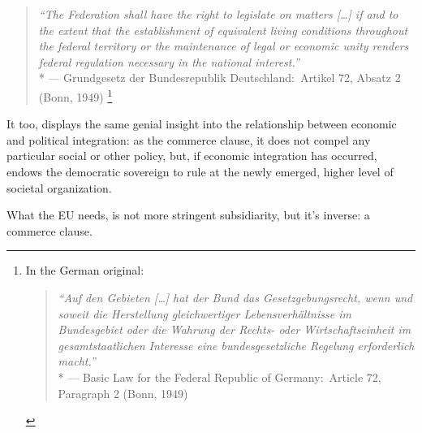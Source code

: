 \begin{quote}
	\emph{``The Federation shall have the right to legislate on matters [\ldots] if and to the extent that the establishment of equivalent living conditions throughout the federal territory or the maintenance of legal or economic unity renders federal regulation necessary in the national interest.''}\\*
	--- Grundgesetz der Bundesrepublik Deutschland:\ Artikel 72, Absatz 2 (Bonn, 1949)
	\footnote{
		In the German original:
		\begin{quote}
			\emph{``Auf den Gebieten [\ldots] hat der Bund das Gesetzgebungsrecht, wenn und soweit die Herstellung gleichwertiger Lebensverhältnisse im Bundesgebiet oder die Wahrung der Rechts- oder Wirtschaftseinheit im gesamtstaatlichen Interesse eine bundesgesetzliche Regelung erforderlich macht.''}\\*
			--- Basic Law for the Federal Republic of Germany:\ Article 72, Paragraph 2 (Bonn, 1949)
		\end{quote}
	}
\end{quote}

It too, displays the same genial insight into the relationship between economic and political integration:
as the commerce clause, it does not compel any particular social or other policy, but, if economic integration has occurred, endows the democratic sovereign to rule at the newly emerged, higher level of societal organization.


What the \gls{EU} needs, is not more stringent subsidiarity, but it's inverse:
a commerce clause.




